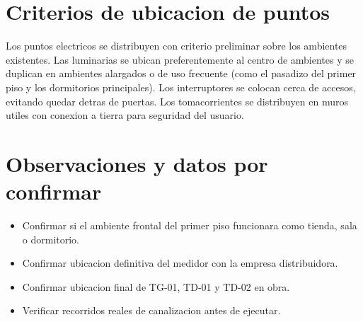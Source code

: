\section{Criterios de ubicacion de puntos}

Los puntos electricos se distribuyen con criterio preliminar sobre los ambientes existentes. Las luminarias se ubican preferentemente al centro de ambientes y se duplican en ambientes alargados o de uso frecuente (como el pasadizo del primer piso y los dormitorios principales). Los interruptores se colocan cerca de accesos, evitando quedar detras de puertas. Los tomacorrientes se distribuyen en muros utiles con conexion a tierra para seguridad del usuario.

\section{Observaciones y datos por confirmar}

\begin{itemize}
  \item Confirmar si el ambiente frontal del primer piso funcionara como tienda, sala o dormitorio.
  \item Confirmar ubicacion definitiva del medidor con la empresa distribuidora.
  \item Confirmar ubicacion final de TG-01, TD-01 y TD-02 en obra.
  \item Verificar recorridos reales de canalizacion antes de ejecutar.
\end{itemize}
